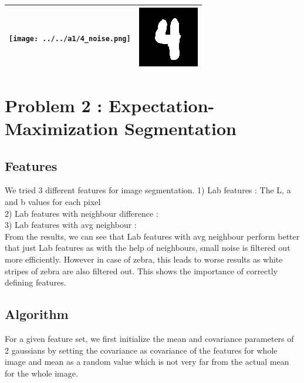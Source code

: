 \documentclass{article}
\begin{document}
\begin{center}
 \begin{tabular}{||c c||}
 \hline
 \texttt{[image: ../../a1/4\_noise.png]} & \includegraphics[width=.4\linewidth]{../image-denoising/output/4_denoise.png} \\ 
 \hline

\end{tabular}
\end{center}


\section{Problem 2 : Expectation-Maximization Segmentation}
\subsection{Features}
We tried 3 different features for image segmentation.
1) Lab features : The L, a and b values for each pixel \\
2) Lab features with neighbour difference : \\
3) Lab features with avg neighbour : \\

From the results, we can see that Lab features with avg neighbour perform better that just Lab features as with the help of neighbours, small noise is filtered out more efficiently. However in case of zebra, this leads to worse results as white stripes of zebra are also filtered out. This shows the importance of correctly defining features.

\subsection{Algorithm}
For a given feature set, we first initialize the mean and covariance parameters of 2 gaussians by setting the covariance as covariance of the features for whole image and mean as a random value which is not very far from the actual mean for the whole image.
\end{document}
